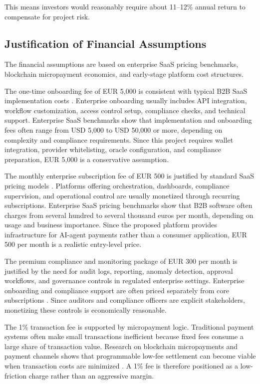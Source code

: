 \documentclass[12pt,a4paper,oneside]{article}
\theoremstyle{definition}
\theoremstyle{plain}
\begin{document}
This means investors would reasonably require about 11--12\% annual return to compensate for project risk.

\subsection{Justification of Financial Assumptions}

The financial assumptions are based on enterprise SaaS pricing benchmarks, blockchain micropayment economics, and early-stage platform cost structures.

The one-time onboarding fee of EUR 5,000 is consistent with typical B2B SaaS implementation costs \citep{dealhub2026,influenceflow2026}. Enterprise onboarding usually includes API integration, workflow customization, access control setup, compliance checks, and technical support. Enterprise SaaS benchmarks show that implementation and onboarding fees often range from USD 5,000 to USD 50,000 or more, depending on complexity and compliance requirements. Since this project requires wallet integration, provider whitelisting, oracle configuration, and compliance preparation, EUR 5,000 is a conservative assumption.

The monthly enterprise subscription fee of EUR 500 is justified by standard SaaS pricing models \citep{dealhub2026}. Platforms offering orchestration, dashboards, compliance supervision, and operational control are usually monetized through recurring subscriptions. Enterprise SaaS pricing benchmarks show that B2B software often charges from several hundred to several thousand euros per month, depending on usage and business importance. Since the proposed platform provides infrastructure for AI-agent payments rather than a consumer application, EUR 500 per month is a realistic entry-level price.

The premium compliance and monitoring package of EUR 300 per month is justified by the need for audit logs, reporting, anomaly detection, approval workflows, and governance controls in regulated enterprise settings. Enterprise onboarding and compliance support are often priced separately from core subscriptions \citep{esignglobal2026}. Since auditors and compliance officers are explicit stakeholders, monetizing these controls is economically reasonable.

The 1\% transaction fee is supported by micropayment logic. Traditional payment systems often make small transactions inefficient because fixed fees consume a large share of transaction value. Research on blockchain micropayments and payment channels shows that programmable low-fee settlement can become viable when transaction costs are minimized \citep{mougayar2016,csiro2026}. A 1\% fee is therefore positioned as a low-friction charge rather than an aggressive margin.
\end{document}
